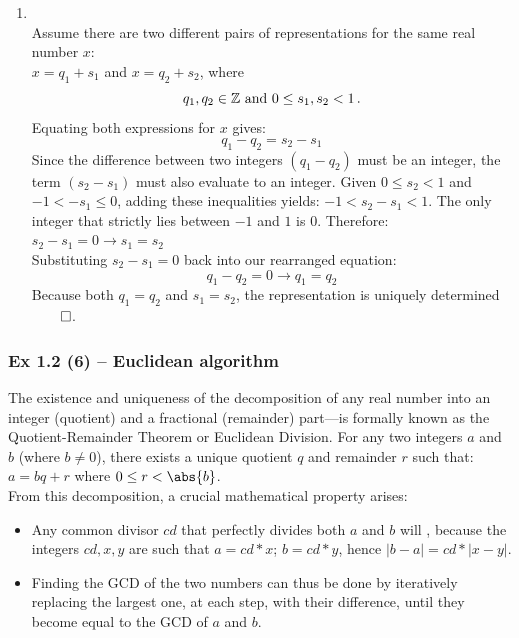 {{\begin{enumerate}
\item {}\\
Assume there are two different pairs of representations for the same real number $x$:\\
$x = q_1 + s_1$ and $x = q_2 + s_2$, where $$q_1, q_2 \in \mathbb{Z} \text{ and } 0 \leq s_1, s_2 < 1\,.$$
Equating both expressions for $x$ gives: 
$$q_1 - q_2 =  s_2 - s_1$$
Since the difference between two integers $(q_1 - q_2)$ must be an integer, the term $(s_2 - s_1)$ must also evaluate to an integer.
Given $0 \leq s_2 < 1$ and $-1 < -s_1 \leq 0$, adding these inequalities yields: $-1 < s_2 - s_1 < 1$. The only integer that strictly
lies between $-1$ and $1$ is $0$. Therefore: $s_2 - s_1 = 0 \rightarrow s_1 = s_2$\\
Substituting $s_2 - s_1 = 0$ back into our rearranged equation:
$$q_1 - q_2 = 0 \rightarrow q_1 = q_2$$
Because both $q_1 = q_2$ and $s_1 = s_2$, the representation is uniquely determined $\qed$.
\end{enumerate}

\subsubsection{Ex 1.2 (6) -- Euclidean algorithm}\label{sec:Ex_1.2.6}

The existence and uniqueness of the decomposition of any real number into an integer (quotient) and a fractional (remainder) part—is formally known as the Quotient-Remainder Theorem or Euclidean Division. 
For any two integers $a$ and $b$ (where $b \neq 0$), there exists a unique quotient $q$ 
and remainder $r$ such that: $a = b q + r$ where $0 \leq r < \abs{b}$.\\

From this decomposition, a crucial mathematical property arises:
\begin{itemize}
\item Any common divisor $cd$ that perfectly divides both $a$ and $b$ will , because
the integers $cd, x, y$ are such that $a = cd*x$; $b = cd*y$, hence $|b - a| = cd * |x - y|$. 
\item Finding the GCD of the two numbers can thus be done by iteratively replacing the largest one, at each step, with their difference, until they become equal to the GCD of $a$ and $b$.
\end{itemize}

\newpage		%

}}

